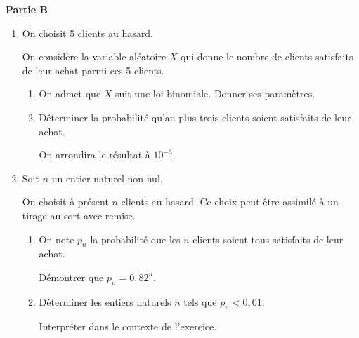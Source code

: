 \documentclass[10pt]{article}
\begin{document}
\medskip

\textbf{Partie B}

\medskip

\begin{enumerate}
\item On choisit 5 clients au hasard. 

On considère la variable aléatoire $X$ qui donne le
nombre de clients satisfaits de leur achat parmi ces 5 clients.
	\begin{enumerate}
		\item On admet que $X$ suit une loi binomiale. Donner ses paramètres.
		\item Déterminer la probabilité qu'au plus trois clients soient satisfaits de leur achat.
		
On arrondira le résultat à $10^{-3}$.
	\end{enumerate}
\item Soit $n$ un entier naturel non nul.

On choisit à présent $n$ clients au hasard. Ce choix peut être assimilé à un tirage au sort avec remise.
	\begin{enumerate}
		\item On note $p_n$ la probabilité que les $n$ clients soient tous satisfaits de leur achat.
		
Démontrer que $p_n = 0,82^n$.
		\item Déterminer les entiers naturels $n$ tels que $p_n < 0,01$. 
		
Interpréter dans le contexte de l'exercice.
	\end{enumerate}
\end{enumerate}

\bigskip
\end{document}
